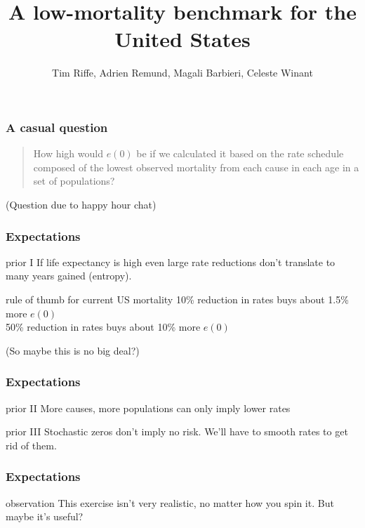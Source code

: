 \documentclass[20pt]{beamer}
\title{A low-mortality benchmark for the United States}
\subtitle{Tim Riffe, Adrien Remund, Magali Barbieri, Celeste Winant}		%
\begin{document}
\begin{frame}
	\titlepage
\end{frame}




\begin{frame}
\frametitle{A casual question}
\begin{quote}
How high would $e(0)$ be if we calculated it based on the rate schedule
composed of the lowest observed mortality from each cause in each age in a
set of populations?
\end{quote}
\color{mygray}
(Question due to happy hour chat)
\end{frame}

\begin{frame}
\frametitle{Expectations}
\begin{block}{prior I}
If life expectancy is high even large rate reductions don't translate to many
years gained (entropy).
\end{block}

\begin{block}{rule of thumb for current US mortality}
10\% reduction in rates buys about 1.5\% more $e(0)$\\
50\% reduction in rates buys about 10\% more $e(0)$
\end{block}
\color{mygray}
(So maybe this is no big deal?)
\end{frame}

\begin{frame}
\frametitle{Expectations}
\begin{block}{prior II}
More causes, more populations can only imply lower rates
\end{block}
\begin{block}{prior III}
Stochastic zeros don't imply no risk. We'll have to smooth rates to get rid of
them.
\end{block}
\end{frame}

\begin{frame}
\frametitle{Expectations}
\begin{block}{observation}
This exercise isn't very realistic, no matter how you spin it. But maybe it's
useful?
\end{block}
\end{frame}
\end{document}
